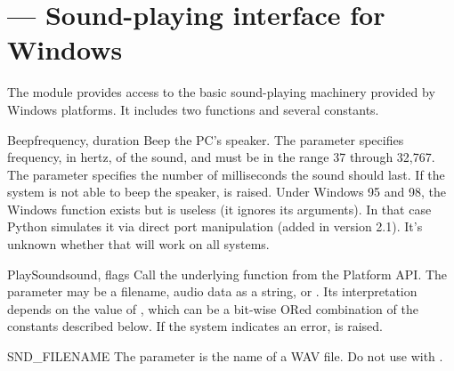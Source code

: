\section{ ---
         Sound-playing interface for Windows}



The  module provides access to the basic
sound-playing machinery provided by Windows platforms.  It includes
two functions and several constants.


\begin{funcdesc}{Beep}{frequency, duration}
  Beep the PC's speaker.
  The  parameter specifies frequency, in hertz, of the
  sound, and must be in the range 37 through 32,767.
  The  parameter specifies the number of milliseconds the
  sound should last.  If the system is not
  able to beep the speaker,  is raised.
    Under Windows 95 and 98, the Windows 
  function exists but is useless (it ignores its arguments).  In that
  case Python simulates it via direct port manipulation (added in version
  2.1).  It's unknown whether that will work on all systems.
\end{funcdesc}

\begin{funcdesc}{PlaySound}{sound, flags}
  Call the underlying  function from the
  Platform API.  The  parameter may be a filename, audio
  data as a string, or .  Its interpretation depends on the
  value of , which can be a bit-wise ORed combination of
  the constants described below.  If the system indicates an error,
   is raised.
\end{funcdesc}


\begin{datadesc}{SND_FILENAME}
  The  parameter is the name of a WAV file.
  Do not use with .
\end{datadesc}

